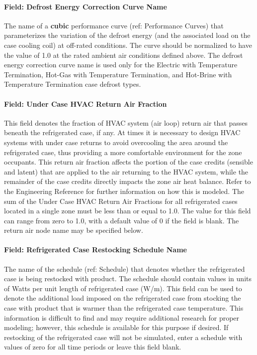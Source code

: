\paragraph{Field: Defrost Energy Correction Curve Name}\label{field-defrost-energy-correction-curve-name}

The name of a \textbf{cubic} performance curve (ref: Performance Curves) that parameterizes the variation of the defrost energy (and the associated load on the case cooling coil) at off-rated conditions. The curve should be normalized to have the value of 1.0 at the rated ambient air conditions defined above. The defrost energy correction curve name is used only for the Electric with Temperature Termination, Hot-Gas with Temperature Termination, and Hot-Brine with Temperature Termination case defrost types.

\paragraph{Field: Under Case HVAC Return Air Fraction}\label{field-under-case-hvac-return-air-fraction}

This field denotes the fraction of HVAC system (air loop) return air that passes beneath the refrigerated case, if any. At times it is necessary to design HVAC systems with under case returns to avoid overcooling the area around the refrigerated case, thus providing a more comfortable environment for the zone occupants. This return air fraction affects the portion of the case credits (sensible and latent) that are applied to the air returning to the HVAC system, while the remainder of the case credits directly impacts the zone air heat balance. Refer to the Engineering Reference for further information on how this is modeled. The sum of the Under Case HVAC Return Air Fractions for all refrigerated cases located in a single zone must be less than or equal to 1.0. The value for this field can range from zero to 1.0, with a default value of 0 if the field is blank. The return air node name may be specified below.

\paragraph{Field: Refrigerated Case Restocking Schedule Name}\label{field-refrigerated-case-restocking-schedule-name}

The name of the schedule (ref: Schedule) that denotes whether the refrigerated case is being restocked with product. The schedule should contain values in units of Watts per unit length of refrigerated case (W/m). This field can be used to denote the additional load imposed on the refrigerated case from stocking the case with product that is warmer than the refrigerated case temperature. This information is difficult to find and may require additional research for proper modeling; however, this schedule is available for this purpose if desired. If restocking of the refrigerated case will not be simulated, enter a schedule with values of zero for all time periods or leave this field blank.

